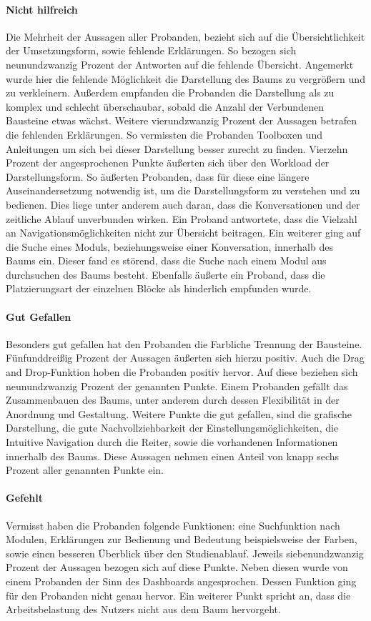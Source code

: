 \paragraph{Nicht hilfreich}Die Mehrheit der Aussagen aller Probanden, bezieht sich auf die Übersichtlichkeit der Umsetzungsform, sowie fehlende Erklärungen. So bezogen sich neunundzwanzig Prozent der Antworten auf die fehlende Übersicht. Angemerkt wurde hier die fehlende Möglichkeit die Darstellung des Baums zu vergrößern und zu verkleinern. Außerdem empfanden die Probanden die Darstellung als zu komplex und schlecht überschaubar, sobald die Anzahl der Verbundenen Bausteine etwas wächst. Weitere vierundzwanzig Prozent der Aussagen betrafen die fehlenden Erklärungen. So vermissten die Probanden Toolboxen und Anleitungen um sich bei dieser Darstellung besser zurecht zu finden. Vierzehn Prozent der angesprochenen Punkte äußerten sich über den Workload der Darstellungsform. So äußerten Probanden, dass für diese eine längere Auseinandersetzung notwendig ist, um die Darstellungsform zu verstehen und zu bedienen. Dies liege unter anderem auch daran, dass die Konversationen und der zeitliche Ablauf unverbunden wirken. Ein Proband antwortete, dass die Vielzahl an Navigationsmöglichkeiten nicht zur Übersicht beitragen. Ein weiterer ging auf die Suche eines Moduls, beziehungsweise einer Konversation, innerhalb des Baums ein. Dieser fand es störend, dass die Suche nach einem Modul aus durchsuchen des Baums besteht. Ebenfalls äußerte ein Proband, dass die Platzierungsart der einzelnen Blöcke als hinderlich empfunden wurde.

\paragraph{Gut Gefallen}Besonders gut gefallen hat den Probanden die Farbliche Trennung der Bausteine.  Fünfunddreißig Prozent der Aussagen äußerten sich hierzu positiv. Auch die Drag and Drop-Funktion hoben die Probanden positiv hervor. Auf diese beziehen sich neunundzwanzig Prozent der genannten Punkte. Einem Probanden gefällt das Zusammenbauen des Baums, unter anderem durch dessen Flexibilität in der Anordnung und Gestaltung. Weitere Punkte die gut gefallen, sind die grafische Darstellung, die gute Nachvollziehbarkeit der Einstellungsmöglichkeiten, die Intuitive Navigation durch die Reiter, sowie die vorhandenen Informationen innerhalb des Baums. Diese Aussagen nehmen einen Anteil von knapp sechs Prozent aller genannten Punkte ein.

\paragraph{Gefehlt}Vermisst haben die Probanden folgende Funktionen: eine Suchfunktion nach Modulen, Erklärungen zur Bedienung und Bedeutung beispielsweise der Farben, sowie einen besseren Überblick über den Studienablauf. Jeweils siebenundzwanzig Prozent der Aussagen bezogen sich auf diese Punkte. Neben diesen wurde von einem Probanden der Sinn des Dashboards angesprochen. Dessen Funktion ging für den Probanden nicht genau hervor. Ein weiterer Punkt spricht an, dass die Arbeitsbelastung des Nutzers nicht aus dem Baum hervorgeht.



